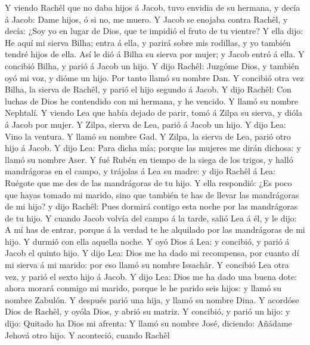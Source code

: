  Y viendo Rachêl que no daba hijos á Jacob, tuvo envidia
de su hermana, y decía á Jacob: Dame hijos, ó si no, me muero.
 Y Jacob se enojaba contra Rachêl, y decía: ¿Soy yo en
lugar de Dios, que te impidió el fruto de tu vientre?  Y
ella dijo: He aquí mi sierva Bilha; entra á ella, y parirá sobre mis
rodillas, y yo también tendré hijos de ella.  Así le dió á
Bilha su sierva por mujer; y Jacob entró á ella.  Y
concibió Bilha, y parió á Jacob un hijo.  Y dijo Rachêl:
Juzgóme Dios, y también oyó mi voz, y dióme un hijo. Por tanto llamó su
nombre Dan.  Y concibió otra vez Bilha, la sierva de
Rachêl, y parió el hijo segundo á Jacob.  Y dijo Rachêl:
Con luchas de Dios he contendido con mi hermana, y he vencido. Y llamó
su nombre Nephtalí.  Y viendo Lea que había dejado de
parir, tomó á Zilpa su sierva, y dióla á Jacob por mujer.
 Y Zilpa, sierva de Lea, parió á Jacob un hijo.
 Y dijo Lea: Vino la ventura. Y llamó su nombre Gad.
 Y Zilpa, la sierva de Lea, parió otro hijo á Jacob.
 Y dijo Lea: Para dicha mía; porque las mujeres me dirán
dichosa: y llamó su nombre Aser.  Y fué Rubén en tiempo
de la siega de los trigos, y halló mandrágoras en el campo, y trájolas á
Lea su madre: y dijo Rachêl á Lea: Ruégote que me des de las mandrágoras
de tu hijo.  Y ella respondió: ¿Es poco que hayas tomado
mi marido, sino que también te has de llevar las mandrágoras de mi hijo?
y dijo Rachêl: Pues dormirá contigo esta noche por las mandrágoras de tu
hijo.  Y cuando Jacob volvía del campo á la tarde, salió
Lea á él, y le dijo: A mí has de entrar, porque á la verdad te he
alquilado por las mandrágoras de mi hijo. Y durmió con ella aquella
noche.  Y oyó Dios á Lea: y concibió, y parió á Jacob el
quinto hijo.  Y dijo Lea: Dios me ha dado mi recompensa,
por cuanto dí mi sierva á mi marido: por eso llamó su nombre Issachâr.
 Y concibió Lea otra vez, y parió el sexto hijo á Jacob.
 Y dijo Lea: Dios me ha dado una buena dote: ahora morará
conmigo mi marido, porque le he parido seis hijos: y llamó su nombre
Zabulón.  Y después parió una hija, y llamó su nombre
Dina.  Y acordóse Dios de Rachêl, y oyóla Dios, y abrió
su matriz.  Y concibió, y parió un hijo: y dijo: Quitado
ha Dios mi afrenta:  Y llamó su nombre José, diciendo:
Añádame Jehová otro hijo.  Y aconteció, cuando Rachêl
